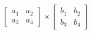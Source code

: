 \documentclass[preview]{standalone}
\begin{document}
\begin{align*}
\begin{bmatrix} a_1 & a_2 \\ a_3 & a_4 \end{bmatrix} \times \begin{bmatrix} b_1 & b_2 \\ b_3 & b_4 \end{bmatrix}
\end{align*}
\end{document}
